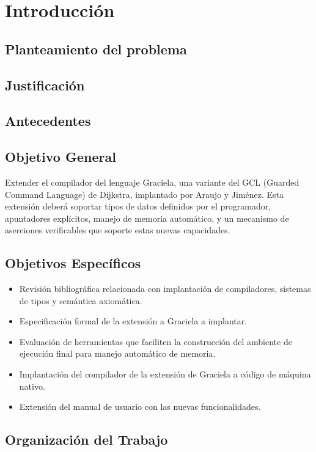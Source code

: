 \chapter*{Introducción}
\label{intro}

\section*{Planteamiento del problema}

\section*{Justificación}

\section*{Antecedentes}

\section*{Objetivo General}

Extender el compilador del lenguaje Graciela, una variante del GCL (Guarded
Command Language) de Dijkstra, implantado por Araujo y Jiménez. Esta extensión
deberá soportar tipos de datos definidos por el programador, apuntadores
explícitos, manejo de memoria automático, y un mecanismo de aserciones
verificables que soporte estas nuevas capacidades.

\section*{Objetivos Específicos}
\begin{itemize}
  \item Revisión bibliográfica relacionada con implantación de compiladores,
  sistemas de tipos y semántica axiomática.

  \item Especificación formal de la extensión a Graciela a implantar.

  \item Evaluación de herramientas que faciliten la construcción del ambiente de
  ejecución final para manejo automático de memoria.

  \item Implantación del compilador de la extensión de Graciela a código de
  máquina nativo.

  \item Extensión del manual de usuario con las nuevas funcionalidades.
\end{itemize}

\section*{Organización del Trabajo}
